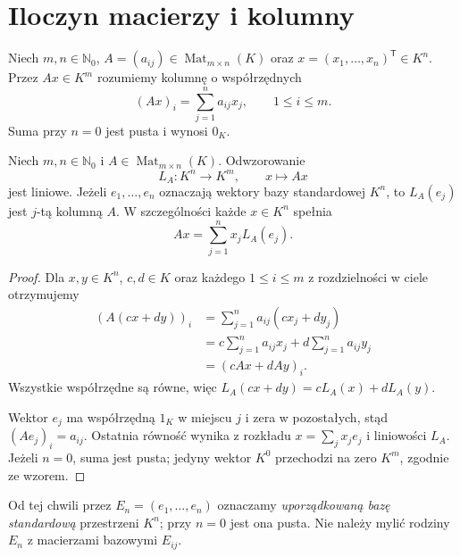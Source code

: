 \section{Iloczyn macierzy i kolumny}
\label{sec:lin4-macierz-kolumna}

\begin{definicja}
\label{def:lin4-iloczyn-kolumna}
Niech \(m,n\in\mathbb N_0\),
\(A=(a_{ij})\in\operatorname{Mat}_{m\times n}(K)\)
oraz \(x=(x_1,\ldots,x_n)^{\mathsf T}\in K^n\).
Przez \(Ax\in K^m\) rozumiemy kolumnę
o współrzędnych
\[
 (Ax)_i=\sum_{j=1}^{n}a_{ij}x_j,
 \qquad 1\leq i\leq m.
\]
Suma przy \(n=0\) jest pusta i wynosi \(0_K\).
\end{definicja}

\begin{stwierdzenie}
\label{prop:lin4-kolumny}
Niech \(m,n\in\mathbb N_0\) i
\(A\in\operatorname{Mat}_{m\times n}(K)\).
Odwzorowanie
\[
 L_A\colon K^n\longrightarrow K^m,\qquad x\longmapsto Ax
\]
jest liniowe. Jeżeli \(e_1,\ldots,e_n\)
oznaczają wektory bazy standardowej \(K^n\),
to \(L_A(e_j)\) jest \(j\)-tą kolumną \(A\).
W szczególności każde \(x\in K^n\) spełnia
\[
 Ax=\sum_{j=1}^{n}x_jL_A(e_j).
\]
\end{stwierdzenie}
\begin{proof}
Dla \(x,y\in K^n\), \(c,d\in K\)
oraz każdego \(1\leq i\leq m\)
z rozdzielności w ciele otrzymujemy
\[
 \begin{aligned}
 (A(cx+dy))_i
 &=\sum_{j=1}^{n}a_{ij}(cx_j+dy_j)\\
 &=c\sum_{j=1}^{n}a_{ij}x_j+
   d\sum_{j=1}^{n}a_{ij}y_j\\
 &=(cAx+dAy)_i.
 \end{aligned}
\]
Wszystkie współrzędne są równe, więc
\(L_A(cx+dy)=cL_A(x)+dL_A(y)\).

Wektor \(e_j\) ma współrzędną \(1_K\)
w miejscu \(j\) i zera w pozostałych,
stąd \((Ae_j)_i=a_{ij}\).
Ostatnia równość wynika z rozkładu
\(x=\sum_j x_je_j\) i liniowości \(L_A\).
Jeżeli \(n=0\), suma jest pusta;
jedyny wektor \(K^0\) przechodzi na zero \(K^m\),
zgodnie ze wzorem.
\end{proof}

Od tej chwili przez \(E_n=(e_1,\ldots,e_n)\)
oznaczamy \emph{uporządkowaną bazę standardową}
przestrzeni \(K^n\); przy \(n=0\) jest ona pusta.
Nie należy mylić rodziny \(E_n\)
z macierzami bazowymi \(E_{ij}\).

